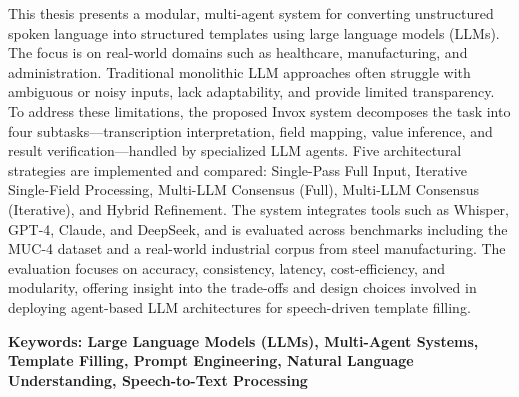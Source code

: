 This thesis presents a modular, multi-agent system for converting unstructured spoken language into structured templates using large language models (LLMs). The focus is on real-world domains such as healthcare, manufacturing, and administration. Traditional monolithic LLM approaches often struggle with ambiguous or noisy inputs, lack adaptability, and provide limited transparency. To address these limitations, the proposed Invox system decomposes the task into four subtasks—transcription interpretation, field mapping, value inference, and result verification—handled by specialized LLM agents. Five architectural strategies are implemented and compared: Single-Pass Full Input, Iterative Single-Field Processing, Multi-LLM Consensus (Full), Multi-LLM Consensus (Iterative), and Hybrid Refinement. The system integrates tools such as Whisper, GPT-4, Claude, and DeepSeek, and is evaluated across benchmarks including the MUC-4 dataset and a real-world industrial corpus from steel manufacturing. The evaluation focuses on accuracy, consistency, latency, cost-efficiency, and modularity, offering insight into the trade-offs and design choices involved in deploying agent-based LLM architectures for speech-driven template filling.

\textbf{Keywords: Large Language Models (LLMs), Multi-Agent Systems, Template Filling, Prompt Engineering, Natural Language Understanding, Speech-to-Text Processing}